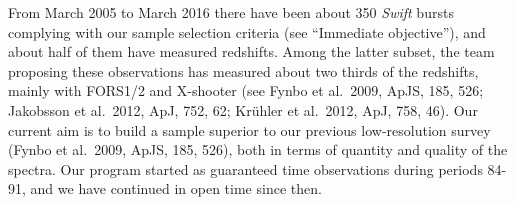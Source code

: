 \smallskip


From March 2005 to March 2016 there have been about 350 {\it Swift} bursts 
complying with
our sample selection criteria (see ``Immediate objective''), and about half of them have
measured redshifts. Among the latter subset, the team proposing these observations has
measured about two thirds of the redshifts, mainly with FORS1/2 and X-shooter (see
Fynbo et al.\ 2009, ApJS, 185, 526;  Jakobsson et al.\ 2012, ApJ, 752, 62;
Kr\"uhler et al.\ 2012, ApJ, 758, 46). Our current aim is to build a sample superior to
our previous low-resolution survey (Fynbo et al.\ 2009, ApJS, 185, 526), both in
terms of quantity and  quality of the spectra. Our program started as 
guaranteed time observations during
periods 84-91, and we have continued in open time since then. 


\smallskip

